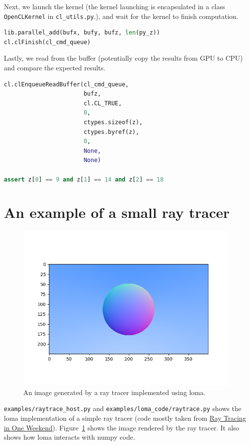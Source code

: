 Next, we launch the kernel (the kernel launching is encapsulated in a class \lstinline{OpenCLKernel} in \lstinline{cl_utils.py}.), and wait for the kernel to finish computation.
\begin{lstlisting}[language=python]
lib.parallel_add(bufx, bufy, bufz, len(py_z))
cl.clFinish(cl_cmd_queue)
\end{lstlisting}

Lastly, we read from the buffer (potentially copy the results from GPU to CPU) and compare the expected results.
\begin{lstlisting}[language=python]
cl.clEnqueueReadBuffer(cl_cmd_queue,
                       bufz,
                       cl.CL_TRUE,
                       0,
                       ctypes.sizeof(z),
                       ctypes.byref(z),
                       0,
                       None,
                       None)

assert z[0] == 9 and z[1] == 14 and z[2] == 18
\end{lstlisting}

\section{An example of a small ray tracer}
\begin{figure}
\centering
\includegraphics[width=0.8\linewidth]{imgs/raytrace.png}
\vspace{-20pt}
\caption{An image generated by a ray tracer implemented using loma.}
\label{fig:raytrace}
\end{figure}

\lstinline{examples/raytrace_host.py} and \lstinline{examples/loma_code/raytrace.py} shows the loma implementation of a simple ray tracer (code mostly taken from \href{https://raytracing.github.io/books/RayTracingInOneWeekend.html}{Ray Tracing in One Weekend}). Figure~\ref{fig:raytrace} shows the image rendered by the ray tracer. It also shows how loma interacts with numpy code.

